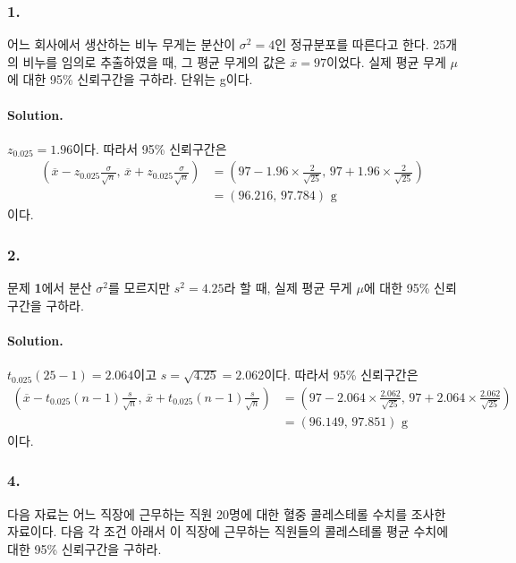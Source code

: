 \subsubsection{1.} 어느 회사에서 생산하는 비누 무게는 분산이 $\sigma^2=4$인 정규분포를 따른다고 한다. 25개의 비누를 임의로 추출하였을 때, 
그 평균 무게의 값은 $\overline{x}=97$이었다. 실제 평균 무게 $\mu$에 대한 95\% 신뢰구간을 구하라. 단위는 g이다.

\paragraph{Solution.} $z_{0.025}=1.96$이다. 따라서 95\% 신뢰구간은
\begin{align*}
    \left(\overline{x}-z_{0.025}\frac{\sigma}{\sqrt{n}},\,\overline{x}+z_{0.025}\frac{\sigma}{\sqrt{n}}\right)
    &= \left(97-1.96\times\frac{2}{\sqrt{25}},\,97+1.96\times\frac{2}{\sqrt{25}}\right) \\
    &= \left(96.216,\,97.784\right)\mbox{ g}
\end{align*}
이다.

\subsubsection{2.} 문제 \textbf{1}에서 분산 $\sigma^2$를 모르지만 $s^2=4.25$라 할 때, 실제 평균 무게 $\mu$에 대한 95\% 신뢰구간을 구하라.

\paragraph{Solution.} $t_{0.025}\left(25-1\right)=2.064$이고 $s=\sqrt{4.25}=2.062$이다. 따라서 95\% 신뢰구간은
\begin{align*}
    \left(\overline{x}-t_{0.025}\left(n-1\right)\frac{s}{\sqrt{n}},\,\overline{x}+t_{0.025}\left(n-1\right)\frac{s}{\sqrt{n}}\right)
    &= \left(97-2.064\times\frac{2.062}{\sqrt{25}},\,97+2.064\times\frac{2.062}{\sqrt{25}}\right) \\
    &= \left(96.149,\,97.851\right)\mbox{ g}
\end{align*}
이다.

\subsubsection{4.} 다음 자료는 어느 직장에 근무하는 직원 20명에 대한 혈중 콜레스테롤 수치를 조사한 자료이다. 다음 각 조건 아래서 이 직장에 근무하는
직원들의 콜레스테롤 평균 수치에 대한 95\% 신뢰구간을 구하라.

